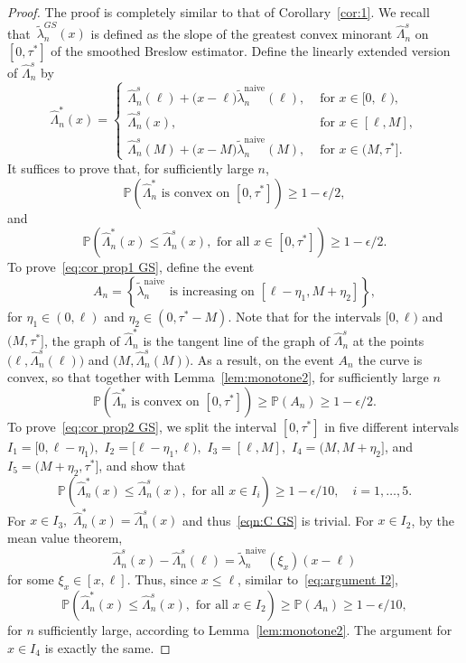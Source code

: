 \documentclass[11pt,reqno]{amsart}
\theoremstyle{definition}
\theoremstyle{plain}
\theoremstyle{remark}
\begin{document}
\begin{proof}
The proof is completely similar to that of Corollary~\ref{cor:1}.
We recall that~$\tilde{\lambda}^{GS}_n(x)$ is defined as the slope of the greatest convex minorant $\hat\Lambda_n^s$
on $[0,\tau^*]$ of the smoothed Breslow estimator.
Define the linearly extended  version of $\hat\Lambda_n^s$ by
\[
\hat\Lambda_n^*(x)
=
\begin{cases}
\hat\Lambda_n^s(\ell)+\big(x-\ell\big)\tilde{\lambda}_n^{\mathrm{naive}}(\ell), &\text{ for } x\in[0,\ell),\\
\hat\Lambda_n^s(x), &\text{ for } x\in[\ell,M],\\
\hat\Lambda_n^s(M)+\big(x-M\big)\tilde{\lambda}_n^{\mathrm{naive}}(M), &\text{ for } x\in(M,\tau^*].
\end{cases}
\]
It suffices to prove that, for sufficiently large $n$,
\begin{equation}
\label{eq:cor prop1 GS}
{\mathbb{P}}
\left(
\hat\Lambda_n^*\text{ is convex on }[0,\tau^*]
\right)\geq 1-\epsilon/2,
\end{equation}
and
\begin{equation}
\label{eq:cor prop2 GS}
{\mathbb{P}}
\left(
\hat\Lambda_n^*(x)\leq \hat\Lambda_n^s(x),
\text{ for all }x\in [0,\tau^*]
\right)\geq 1-\epsilon/2.
\end{equation}
To prove~\eqref{eq:cor prop1 GS}, define the event
\[
A_n=\left\{\tilde{\lambda}_n^{\mathrm{naive}} \text{ is increasing on } [\ell-\eta_1,M+\eta_2]\right\},
\]
for $\eta_1\in(0,\ell)$ and $\eta_2\in(0,\tau^*-M)$.
Note that for the intervals $[0,\ell)$ and $(M,\tau^*]$,
the graph of $\hat\Lambda_n^*$ is the tangent line of the graph of $\hat\Lambda_n^s$
at the points $\big(\ell,\hat\Lambda_n^s(\ell)\big)$ and $\big(M,\hat\Lambda_n^s(M)\big)$.
As a result, on the event $A_n$ the curve is convex, so that together with Lemma~\ref{lem:monotone2},
for sufficiently large $n$
\[
{\mathbb{P}}
\left(
\hat\Lambda_n^*\text{ is convex on }[0,\tau^*]
\right)
\geq
{\mathbb{P}}(A_n)
\geq
1-\epsilon/2.
\]
To prove~\eqref{eq:cor prop2 GS}, we split the interval $[0,\tau^*]$ in five different intervals
$I_1=[0,\ell-\eta_1),$ $I_2=[\ell-\eta_1,\ell),$ $I_3=[\ell,M],$ $I_4=(M,M+\eta_2]$, and $I_5=(M+\eta_2,\tau^*]$,
and show that
\begin{equation}
\label{eqn:C GS}
{\mathbb{P}}
\left(
\hat\Lambda_n^*(x)\leq \hat\Lambda_n^s(x),\text{ for all }x\in I_i
\right)\geq 1-\epsilon/10,
\quad
i=1,\ldots,5.
\end{equation}
For $x\in I_3,$ $\hat\Lambda_n^*(x)=\hat\Lambda_n^s(x)$ and thus~\eqref{eqn:C GS} is trivial.
For $x\in I_2$, by the mean value theorem,
\[
\hat\Lambda_n^s(x)-\hat\Lambda_n^s(\ell)
=
\tilde{\lambda}_n^{\mathrm{naive}}(\xi_x)(x-\ell)
\]
for some $\xi_x\in[x,\ell]$.
Thus, since $x\leq \ell$, similar to~\eqref{eq:argument I2},
\[
{\mathbb{P}}
\left(
\hat\Lambda_n^*(x)\leq \hat\Lambda_n^s(x),\text{ for all }x\in I_2
\right)
\geq
{\mathbb{P}}(A_n)\geq 1-\epsilon/10,
\]
for $n$ sufficiently large, according to Lemma~\ref{lem:monotone2}.
The argument for $x\in I_4$ is exactly the same.


\end{proof}
\end{document}
